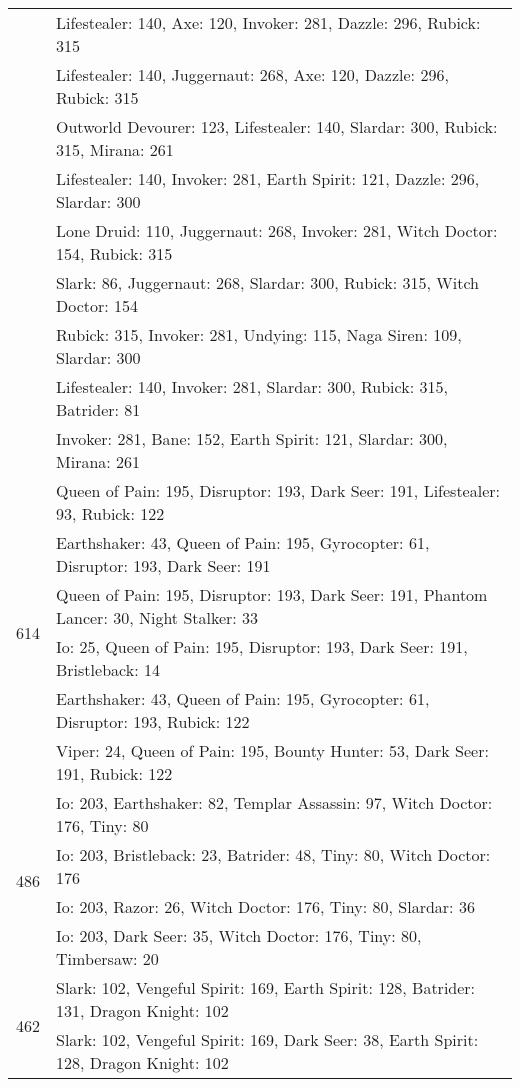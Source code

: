 \documentclass[result.tex]{subfiles}
\begin{document}
\begin{table}[H]
\begin{tabular}{ | c | p{12.5cm} | }
& Lifestealer: 140, Axe: 120, Invoker: 281, Dazzle: 296, Rubick: 315 \\
& Lifestealer: 140, Juggernaut: 268, Axe: 120, Dazzle: 296, Rubick: 315 \\
& Outworld Devourer: 123, Lifestealer: 140, Slardar: 300, Rubick: 315, Mirana: 261 \\
& Lifestealer: 140, Invoker: 281, Earth Spirit: 121, Dazzle: 296, Slardar: 300 \\
& Lone Druid: 110, Juggernaut: 268, Invoker: 281, Witch Doctor: 154, Rubick: 315 \\
& Slark: 86, Juggernaut: 268, Slardar: 300, Rubick: 315, Witch Doctor: 154 \\
& Rubick: 315, Invoker: 281, Undying: 115, Naga Siren: 109, Slardar: 300 \\
& Lifestealer: 140, Invoker: 281, Slardar: 300, Rubick: 315, Batrider: 81 \\
& Invoker: 281, Bane: 152, Earth Spirit: 121, Slardar: 300, Mirana: 261 \\
\hline
\multirow{6}{*}{614}
& Queen of Pain: 195, Disruptor: 193, Dark Seer: 191, Lifestealer: 93, Rubick: 122 \\
& Earthshaker: 43, Queen of Pain: 195, Gyrocopter: 61, Disruptor: 193, Dark Seer: 191 \\
& Queen of Pain: 195, Disruptor: 193, Dark Seer: 191, Phantom Lancer: 30, Night Stalker: 33 \\
& Io: 25, Queen of Pain: 195, Disruptor: 193, Dark Seer: 191, Bristleback: 14 \\
& Earthshaker: 43, Queen of Pain: 195, Gyrocopter: 61, Disruptor: 193, Rubick: 122 \\
& Viper: 24, Queen of Pain: 195, Bounty Hunter: 53, Dark Seer: 191, Rubick: 122 \\
\hline
\multirow{4}{*}{486}
& Io: 203, Earthshaker: 82, Templar Assassin: 97, Witch Doctor: 176, Tiny: 80 \\
& Io: 203, Bristleback: 23, Batrider: 48, Tiny: 80, Witch Doctor: 176 \\
& Io: 203, Razor: 26, Witch Doctor: 176, Tiny: 80, Slardar: 36 \\
& Io: 203, Dark Seer: 35, Witch Doctor: 176, Tiny: 80, Timbersaw: 20 \\
\hline
\multirow{4}{*}{462}
& Slark: 102, Vengeful Spirit: 169, Earth Spirit: 128, Batrider: 131, Dragon Knight: 102 \\
& Slark: 102, Vengeful Spirit: 169, Dark Seer: 38, Earth Spirit: 128, Dragon Knight: 102 \\

\end{tabular}
\end{table}
\end{document}
